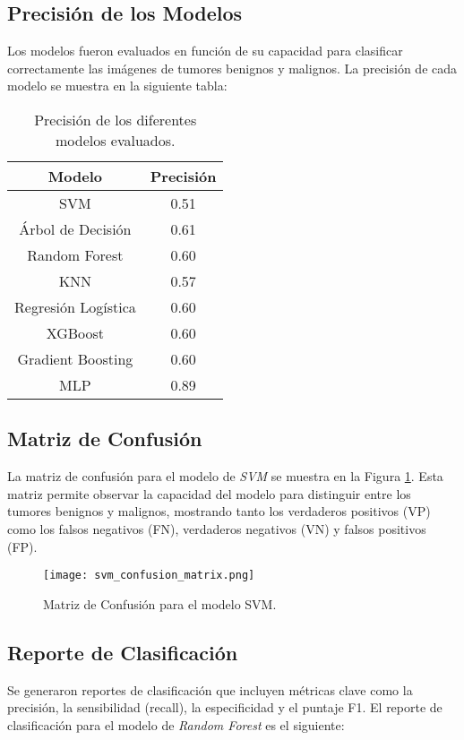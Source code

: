 \documentclass[12pt]{article}
\begin{document}
\subsection{Precisión de los Modelos}
Los modelos fueron evaluados en función de su capacidad para clasificar correctamente las imágenes de tumores benignos y malignos. La precisión de cada modelo se muestra en la siguiente tabla:

\begin{table}[h]
\centering
\begin{tabular}{|c|c|}
\hline
\textbf{Modelo} & \textbf{Precisión} \\
\hline
SVM & 0.51\\
Árbol de Decisión & 0.61\\
Random Forest & 0.60\\
KNN & 0.57\\
Regresión Logística & 0.60\\
XGBoost & 0.60\\
Gradient Boosting & 0.60\\
MLP & 0.89 \\
\hline
\end{tabular}
\caption{Precisión de los diferentes modelos evaluados.}
\end{table}

\subsection{Matriz de Confusión}
La matriz de confusión para el modelo de \textit{SVM} se muestra en la Figura \ref{fig:svm_cm}. Esta matriz permite observar la capacidad del modelo para distinguir entre los tumores benignos y malignos, mostrando tanto los verdaderos positivos (VP) como los falsos negativos (FN), verdaderos negativos (VN) y falsos positivos (FP).

\begin{figure}[h]
    \centering
    \texttt{[image: svm\_confusion\_matrix.png]}
    \caption{Matriz de Confusión para el modelo SVM.}
    \label{fig:svm_cm}
\end{figure}

\subsection{Reporte de Clasificación}
Se generaron reportes de clasificación que incluyen métricas clave como la precisión, la sensibilidad (recall), la especificidad y el puntaje F1. El reporte de clasificación para el modelo de \textit{Random Forest} es el siguiente:
\end{document}
